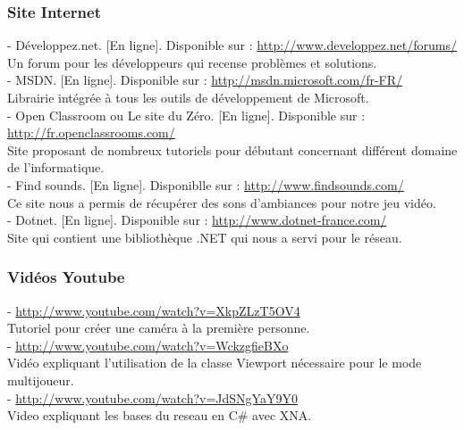 \documentclass[12pt]{article}
\begin{document}
\subsubsection{Site Internet}
\noindent
- Développez.net. [En ligne]. Disponible sur : \underline{http://www.developpez.net/forums/} \\
Un forum pour les développeurs qui recense problèmes et solutions. \\
- MSDN. [En ligne]. Disponible sur :  \underline{http://msdn.microsoft.com/fr-FR/} \\
Librairie intégrée à tous les outils de développement de Microsoft. \\
- Open Classroom ou Le site du Zéro. [En ligne]. Disponible sur : \underline{http://fr.openclassrooms.com/} \\
Site proposant de nombreux tutoriels pour débutant concernant différent domaine de l'informatique. \\
- Find sounds. [En ligne]. Disponiblle sur :  \underline{http://www.findsounds.com/} \\
Ce site nous a permis de récupérer des sons d'ambiances pour notre jeu vidéo.\\
- Dotnet. [En ligne]. Disponible sur :  \underline{http://www.dotnet-france.com/} \\
Site qui contient une bibliothèque .NET qui nous a servi pour le réseau. 
\newpage
\subsubsection{Vidéos Youtube}
\noindent
-  \underline{http://www.youtube.com/watch?v=XkpZLzT5OV4} \\
Tutoriel pour créer une caméra à la première personne. \\
-  \underline{http://www.youtube.com/watch?v=WckzgfieBXo} \\
Vidéo expliquant l'utilisation de la classe Viewport nécessaire pour le mode multijoueur. \\
-  \underline{http://www.youtube.com/watch?v=JdSNgYaY9Y0} \\
Video expliquant les bases du reseau en C\# avec XNA. 

\newpage
{}

\newpage
\thispagestyle{empty}
\pagestyle{fancyplain} \chead{} 
\listoffigures
{}
\end{document}
